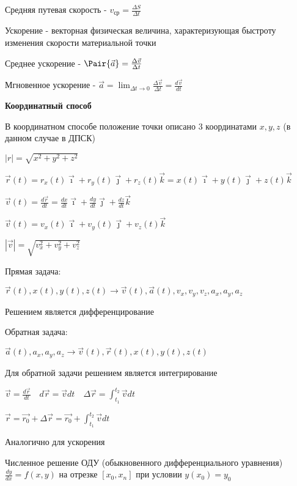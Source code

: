 \documentclass[12pt]{article}
\begin{document}
    Средняя путевая скорость - $v_{\text{ср}} = \frac{\Delta S}{\Delta t}$

    \Def Ускорение - векторная физическая величина, характеризующая быстроту изменения скорости материальной точки

    Среднее ускорение - $\Pair{\vec{a}} = \frac{\Delta \vec{v}}{\Delta t}$

    Мгновенное ускорение - $\vec{a} = \lim_{\Delta t \to 0} \frac{\Delta \vec{v}}{\Delta t} = \frac{d \vec{v}}{dt}$


    \textbf{Координатный способ}

    В координатном способе положение точки описано 3 координатами $x, y, z$ (в данном случае в ДПСК)

    $|r| = \sqrt{x^2 + y^2 + z^2}$

    $\vec{r} (t) = r_x (t) \vec{\imath} + r_y (t) \vec{\jmath} + r_z (t) \vec{k} = x(t) \vec{\imath} + y(t) \vec{\jmath} + z(t) \vec{k}$

    $\vec{v} (t) = \frac{d \vec{r}}{dt} = \frac{dx}{dt} \vec{\imath} + \frac{dy}{dt} \vec{\jmath} + \frac{dz}{dt} \vec{k}$

    $\vec{v} (t) = v_x(t)\vec{\imath} + v_y(t) \vec{\jmath} + v_z(t) \vec{k}$

    $|\vec{v}| = \sqrt{v_x^2 + v_y^2 + v_z^2}$



    Прямая задача:

    $\vec{r}(t), x(t), y(t), z(t) \longrightarrow \vec{v}(t), \vec{a}(t), v_x, v_y, v_z, a_x, a_y, a_z$

    Решением является дифференцирование

    Обратная задача:

    $\vec{a}(t), a_x, a_y, a_z \longrightarrow \vec{v}(t), \vec{r}(t), x(t), y(t), z(t)$

    Для обратной задачи решением является интегрирование

    $\vec{v} = \frac{d\vec{r}}{dt} \quad d\vec{r} = \vec{v}dt \quad \Delta\vec{r} = \int_{t_1}^{t_2} \vec{v}dt$

    \begin{tcolorbox}
        $\vec{r} = \vec{r_0} + \Delta \vec{r} = \vec{r_0} + \int_{t_1}^{t_2} \vec{v}dt$
    \end{tcolorbox}

    Аналогично для ускорения

    Численное решение ОДУ (обыкновенного дифференциального уравнения) $\frac{dy}{dx} = f(x, y)$ на отрезке $[x_0, x_n]$ при условии $y(x_0) = y_0$
\end{document}
